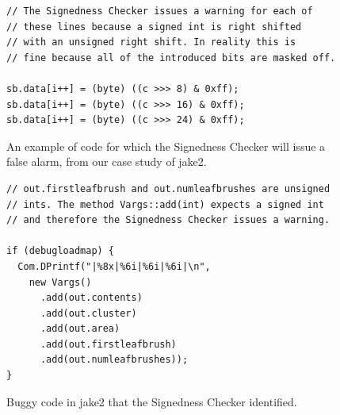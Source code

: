 \documentclass{sig-alternate-05-2015}
\begin{document}
\begin{figure}[t]
\begin{lstlisting}
// The Signedness Checker issues a warning for each of
// these lines because a signed int is right shifted
// with an unsigned right shift. In reality this is
// fine because all of the introduced bits are masked off.

sb.data[i++] = (byte) ((c >>> 8) & 0xff);
sb.data[i++] = (byte) ((c >>> 16) & 0xff);
sb.data[i++] = (byte) ((c >>> 24) & 0xff);

\end{lstlisting}
\vspace{-10pt}
\caption{An example of code for which the Signedness Checker will issue a false
alarm, from our case study of jake2.}
\label{fig:false-alarm}
\end{figure}

\begin{figure}[h]
\begin{lstlisting}
// out.firstleafbrush and out.numleafbrushes are unsigned
// ints. The method Vargs::add(int) expects a signed int
// and therefore the Signedness Checker issues a warning.

if (debugloadmap) {
  Com.DPrintf("|%8x|%6i|%6i|%6i|\n",
    new Vargs()
      .add(out.contents)
      .add(out.cluster)
      .add(out.area)
      .add(out.firstleafbrush)
      .add(out.numleafbrushes));
}

\end{lstlisting}
\vspace{-10pt}
\caption{Buggy code in jake2 that the Signedness Checker identified.}
\label{fig:bug}
\end{figure}

\newpage


\end{document}
